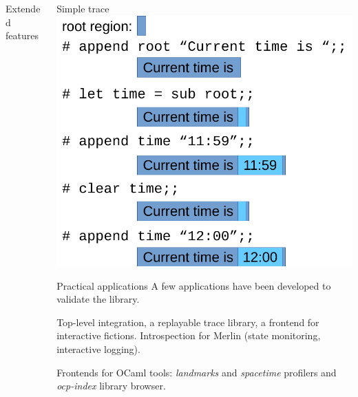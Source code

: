 \documentclass[final]{beamer}
\newlength{\onecolwid}
\newlength{\twocolwid}
\begin{document}
\begin{frame}[containsverbatim,t]
\begin{columns}[t]
\begin{column}{\twocolwid}
\begin{columns}[t,totalwidth=\twocolwid]
\begin{column}{\onecolwid}
\begin{block}{Extended features}
\end{block}

\end{column}

\begin{column}{\onecolwid}\vspace{-.6in} %

\begin{block}{Simple trace}
\includegraphics[width=0.8\onecolwid]{trace}
\end{block}

\begin{block}{Practical applications}
A few applications have been developed to validate the library.

Top-level integration, a replayable trace library, a frontend for interactive
fictions.  Introspection for Merlin (state monitoring, interactive logging).

Frontends for OCaml tools: {\em landmarks} and {\em spacetime} profilers and
{\em ocp-index} library browser.


\end{block}

\end{column}

\end{columns}

\end{column} %


\end{columns}
\end{frame}
\end{document}
